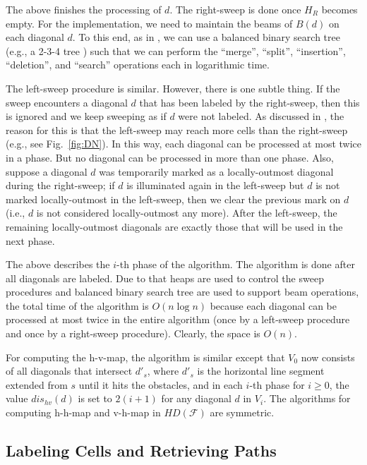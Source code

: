 \documentclass[english,runningheads,11pt]{llncs-revised}
\def\calF{\mathcal{F}}
\newcommand{\htd}{\mbox{$H\!D$}}
\begin{document}
The above finishes the processing of $d$.  The right-sweep is done
once $H_R$ becomes empty. For the implementation, we
need to maintain the beams of $B(d)$ on each diagonal $d$. To this end,
as in \cite{ref:DasGe91}, we can use
a balanced binary search tree (e.g., a 2-3-4 tree \cite{ref:CLRS09}) such that we can perform
the ``merge'', ``split'', ``insertion'',
``deletion'', and ``search'' operations each in logarithmic time.


The left-sweep procedure is similar. However, there is one
subtle thing. If the sweep encounters a diagonal $d$ that has been
labeled by the right-sweep, then this is ignored and
we keep sweeping as if $d$ were not labeled.
As discussed in
\cite{ref:DasGe91}, the reason for this is that the left-sweep may reach more
cells than the right-sweep (e.g., see Fig.~\ref{fig:DN}). In this way, each diagonal
can be processed at most twice in a phase. But no diagonal can be
processed in more than one phase.
Also, suppose a diagonal $d$ was temporarily marked as a locally-outmost diagonal during the right-sweep; if $d$ is illuminated again in the left-sweep but $d$ is not marked locally-outmost in the left-sweep, then we clear the previous mark on $d$ (i.e., $d$ is not considered locally-outmost  any more).
After the left-sweep, the
remaining locally-outmost diagonals are exactly those that will be
used in the next phase.

The above describes the $i$-th phase of the algorithm. The algorithm
is done after all diagonals are labeled.
Due to that heaps are used to control the sweep procedures and balanced binary
search tree are used to support beam operations, the total time of the
algorithm is $O(n\log n)$ because each diagonal can be processed at most
twice in the entire algorithm (once by a left-sweep procedure and
once by a right-sweep procedure). Clearly, the space is $O(n)$.

For computing the h-v-map, the algorithm is similar except that $V_0$ now consists of all
diagonals that intersect $d'_s$, where $d'_s$ is the horizontal line segment
extended from $s$ until it hits the obstacles, and in each $i$-th
phase for $i\geq 0$, the value $dis_{hv}(d)$ is set to $2(i+1)$ for
any diagonal $d$ in $V_i$. The algorithms for computing
h-h-map and v-h-map in $\htd(\calF)$ are symmetric.

\subsection{Labeling Cells and Retrieving Paths}
\label{sec:labelcell}
\end{document}

